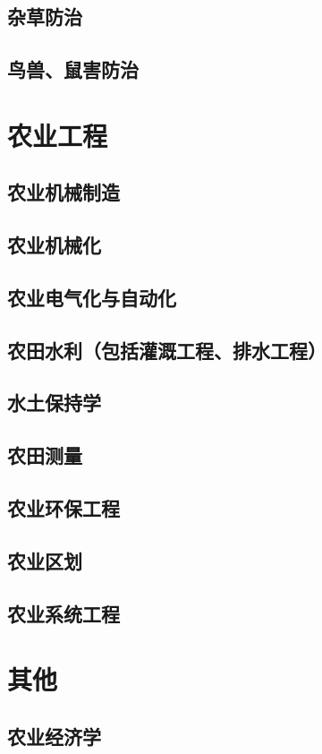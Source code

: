 \documentclass[UTF8]{../ApplicationUniverse}
\begin{document}
\section{杂草防治}
\section{鸟兽、鼠害防治}

\chapter{农业工程}
\section{农业机械制造}
\section{农业机械化}
\section{农业电气化与自动化}
\section{农田水利（包括灌溉工程、排水工程）}
\section{水土保持学}
\section{农田测量}
\section{农业环保工程}
\section{农业区划}
\section{农业系统工程}

\chapter{其他}
\section{农业经济学}
\end{document}
